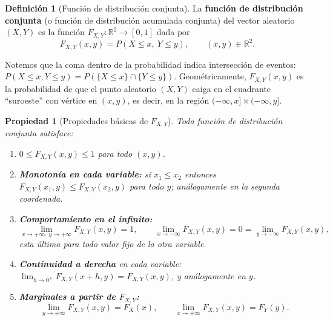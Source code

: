 \documentclass[11pt,a4paper]{article}
\theoremstyle{plain}
\newtheorem{propiedad}[teorema]{Propiedad}
\theoremstyle{definition}
\newtheorem{definicion}[teorema]{Definición}
\theoremstyle{remark}
\begin{document}
\begin{definicion}[Función de distribución conjunta]
La \textbf{función de distribución conjunta} (o función de distribución acumulada conjunta) del vector aleatorio $(X,Y)$ es la función $F_{X,Y}:\mathbb R^2\to[0,1]$ dada por
\[
F_{X,Y}(x,y) = P(X\le x,\ Y\le y), \qquad (x,y)\in\mathbb R^2.
\]
\end{definicion}

Notemos que la coma dentro de la probabilidad indica intersección de eventos: $P(X\le x, Y\le y) = P(\{X\le x\}\cap\{Y\le y\})$. Geométricamente, $F_{X,Y}(x,y)$ es la probabilidad de que el punto aleatorio $(X,Y)$ caiga en el cuadrante ``suroeste'' con vértice en $(x,y)$, es decir, en la región $(-\infty,x]\times(-\infty,y]$.

\begin{propiedad}[Propiedades básicas de $F_{X,Y}$]\label{prop:propiedadesF}
Toda función de distribución conjunta satisface:
\begin{enumerate}[label=(\roman*)]
\item $0\le F_{X,Y}(x,y)\le 1$ para todo $(x,y)$.
\item \textbf{Monotonía en cada variable:} si $x_1\le x_2$ entonces $F_{X,Y}(x_1,y)\le F_{X,Y}(x_2,y)$ para todo $y$; análogamente en la segunda coordenada.
\item \textbf{Comportamiento en el infinito:}
\[
\lim_{x\to+\infty,\ y\to+\infty} F_{X,Y}(x,y) = 1, \qquad \lim_{x\to-\infty} F_{X,Y}(x,y) = 0 = \lim_{y\to-\infty} F_{X,Y}(x,y),
\]
esta última para todo valor fijo de la otra variable.
\item \textbf{Continuidad a derecha} en cada variable: $\lim_{h\to0^+} F_{X,Y}(x+h,y) = F_{X,Y}(x,y)$, y análogamente en $y$.
\item \textbf{Marginales a partir de $F_{X,Y}$:}
\[
\lim_{y\to+\infty} F_{X,Y}(x,y) = F_X(x), \qquad \lim_{x\to+\infty} F_{X,Y}(x,y) = F_Y(y).
\]
\end{enumerate}
\end{propiedad}
\end{document}
